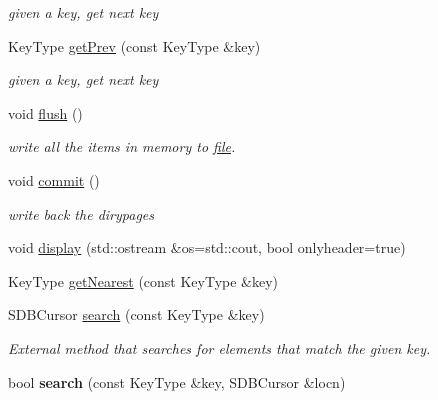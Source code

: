 \begin{CompactItemize}
\begin{CompactList}\small\item\em given a key, get next key \item\end{CompactList}\item 
\hypertarget{classBTreeFile_5b2991be9d5c88ae1b269572e6ee2747}{
KeyType \hyperlink{classBTreeFile_5b2991be9d5c88ae1b269572e6ee2747}{getPrev} (const KeyType \&key)}
\label{classBTreeFile_5b2991be9d5c88ae1b269572e6ee2747}

\begin{CompactList}\small\item\em given a key, get next key \item\end{CompactList}\item 
\hypertarget{classBTreeFile_23afa194f796512b34c002af01dc25a8}{
void \hyperlink{classBTreeFile_23afa194f796512b34c002af01dc25a8}{flush} ()}
\label{classBTreeFile_23afa194f796512b34c002af01dc25a8}

\begin{CompactList}\small\item\em write all the items in memory to \hyperlink{classfile}{file}. \item\end{CompactList}\item 
\hypertarget{classBTreeFile_3efffc668457bd1d85a08bef461731b9}{
void \hyperlink{classBTreeFile_3efffc668457bd1d85a08bef461731b9}{commit} ()}
\label{classBTreeFile_3efffc668457bd1d85a08bef461731b9}

\begin{CompactList}\small\item\em write back the dirypages \item\end{CompactList}\item 
void \hyperlink{classBTreeFile_005fb40d2dbb29e75ef0a0a7a4faa71d}{display} (std::ostream \&os=std::cout, bool onlyheader=true)
\item 
KeyType \hyperlink{classBTreeFile_05829fd2f39c24fe36b5a3a395437de9}{getNearest} (const KeyType \&key)
\item 
\hypertarget{classBTreeFile_8fca5f21802218f0a654e1c70e51d193}{
SDBCursor \hyperlink{classBTreeFile_8fca5f21802218f0a654e1c70e51d193}{search} (const KeyType \&key)}
\label{classBTreeFile_8fca5f21802218f0a654e1c70e51d193}

\begin{CompactList}\small\item\em External method that searches for elements that match the given key. \item\end{CompactList}\item 
\hypertarget{classBTreeFile_f175ce31694ff970ef09e90a29358770}{
bool \textbf{search} (const KeyType \&key, SDBCursor \&locn)}
\label{classBTreeFile_f175ce31694ff970ef09e90a29358770}

\end{CompactItemize}


